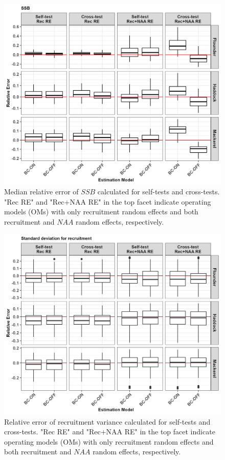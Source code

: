 \documentclass[
  12pt,
]{article}
\begin{document}
\begin{figure}[H]
\centering
\includegraphics[width=\textwidth]{Original_Figures&Tables/Median_SSB.PNG}
\caption{Median relative error of $SSB$ calculated for self-tests and cross-tests. "Rec RE" and "Rec+NAA RE" in the top facet indicate operating models (OMs) with only recruitment random effects and both recruitment and $NAA$ random effects, respectively.}
\label{fig:Median_SSB}
\end{figure}

\begin{figure}[H]
\centering
\includegraphics[width=\textwidth]{Original_Figures&Tables/Rec_sigma.PNG}
\caption{Relative error of recruitment variance calculated for self-tests and cross-tests. "Rec RE" and "Rec+NAA RE" in the top facet indicate operating models (OMs) with only recruitment random effects and both recruitment and $NAA$ random effects, respectively.}
\label{fig:Rec_sigma}
\end{figure}
\end{document}

